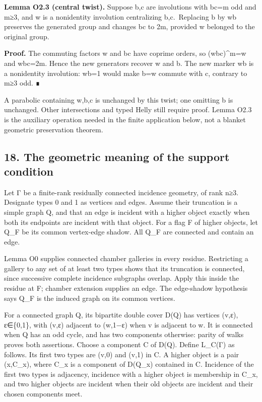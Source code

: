 \documentclass[
  10pt,
  letterpaper,
]{article}
\begin{document}
\textbf{Lemma O2.3 (central twist).} Suppose b,c are involutions with
\textbar bc\textbar=m odd and m≥3, and w is a nonidentity involution
centralizing b,c.~Replacing b by wb preserves the generated group and
changes \textbar bc\textbar{} to 2m, provided w belonged to the original
group.

\textbf{Proof.} The commuting factors w and bc have coprime orders, so
(wbc)\^{}m=w and \textbar wbc\textbar=2m. Hence the new generators
recover w and b. The new marker wb is a nonidentity involution: wb=1
would make b=w commute with c, contrary to m≥3 odd. ∎

A parabolic containing w,b,c is unchanged by this twist; one omitting b
is unchanged. Other intersections and typed Helly still require proof.
Lemma O2.3 is the auxiliary operation needed in the finite application
below, not a blanket geometric preservation theorem.

\subsection{18. The geometric meaning of the support
condition}\label{the-geometric-meaning-of-the-support-condition}

Let Γ be a finite-rank residually connected incidence geometry, of rank
n≥3. Designate types 0 and 1 as vertices and edges. Assume their
truncation is a simple graph Q, and that an edge is incident with a
higher object exactly when both its endpoints are incident with that
object. For a flag F of higher objects, let Q\_F be its common
vertex-edge shadow. All Q\_F are connected and contain an edge.

Lemma O0 supplies connected chamber galleries in every residue.
Restricting a gallery to any set of at least two types shows that its
truncation is connected, since successive complete incidence subgraphs
overlap. Apply this inside the residue at F; chamber extension supplies
an edge. The edge-shadow hypothesis says Q\_F is the induced graph on
its common vertices.

For a connected graph Q, its bipartite double cover D(Q) has vertices
(v,ε), ε∈\{0,1\}, with (v,ε) adjacent to (w,1−ε) when v is adjacent to
w. It is connected when Q has an odd cycle, and has two components
otherwise: parity of walks proves both assertions. Choose a component C
of D(Q). Define L\_C(Γ) as follows. Its first two types are (v,0) and
(v,1) in C. A higher object is a pair (x,C\_x), where C\_x is a
component of D(Q\_x) contained in C. Incidence of the first two types is
adjacency, incidence with a higher object is membership in C\_x, and two
higher objects are incident when their old objects are incident and
their chosen components meet.
\end{document}
